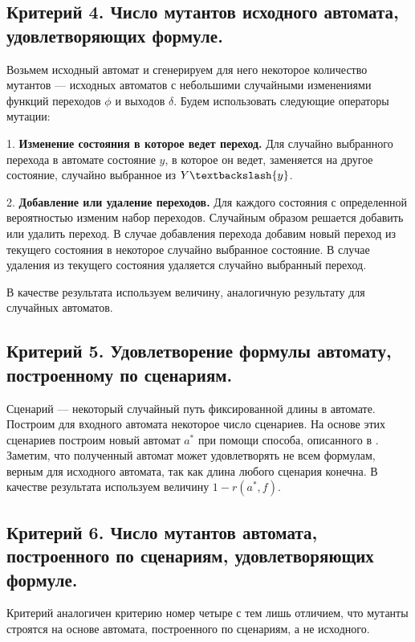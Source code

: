 \documentclass[12pt,fleqn]{article}
\begin{document}
\subsection{Критерий 4. Число мутантов исходного автомата, удовлетворяющих формуле.}

Возьмем исходный автомат и сгенерируем для него некоторое количество мутантов --- исходных автоматов с небольшими
случайными изменениями функций переходов $\phi$ и выходов $\delta$. Будем использовать следующие операторы мутации:

1. \textbf{Изменение состояния в которое ведет переход.} Для случайно выбранного перехода в автомате состояние $y$,
в которое он ведет, заменяется на другое состояние, случайно выбранное из $Y \textbackslash \{y\}$. 

2. \textbf{Добавление или удаление переходов.} Для каждого состояния с определенной вероятностью изменим набор переходов.
Случайным образом решается добавить или удалить переход. В случае добавления перехода добавим новый переход из
текущего состояния в некоторое случайно выбранное состояние. В случае удаления из текущего состояния удаляется
случайно выбранный переход.

В качестве результата используем величину, аналогичную результату для случайных автоматов.

\subsection{Критерий 5. Удовлетворение формулы автомату, построенному по сценариям.}

Сценарий --- некоторый случайный путь фиксированной длины в автомате. Построим для входного автомата некоторое
число сценариев. На основе этих сценариев построим новый автомат $a^*$ при помощи способа, описанного в \cite{eg}.
Заметим, что полученный автомат может удовлетворять не всем формулам, верным для исходного автомата, так как
длина любого сценария конечна. В качестве результата используем величину $1 - r(a^*, f)$.

\subsection{Критерий 6. Число мутантов автомата, построенного по сценариям, удовлетворяющих формуле.}

Критерий аналогичен критерию номер четыре с тем лишь отличием, что мутанты строятся на основе автомата, построенного по
сценариям, а не исходного.
\end{document}

